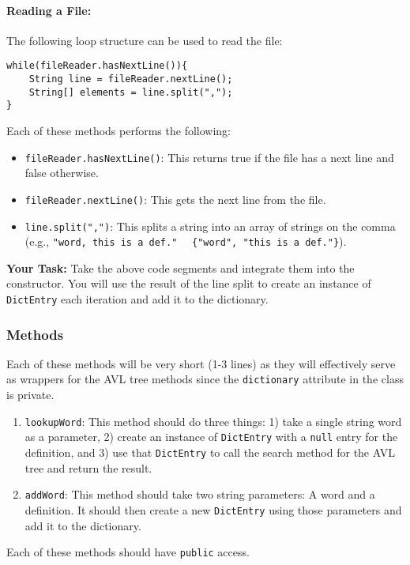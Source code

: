 \documentclass[a4paper]{article}
\begin{document}
\paragraph{Reading a File: } 

The following loop structure can be used to read the file:
\begin{lstlisting}[frame=trBL]
while(fileReader.hasNextLine()){
    String line = fileReader.nextLine();
    String[] elements = line.split(",");
}
\end{lstlisting}

Each of these methods performs the following:
\begin{itemize}
    \item \lstinline|fileReader.hasNextLine()|: This returns true if the file has a next line and false otherwise.
    \item \lstinline|fileReader.nextLine()|: This gets the next line from the file.
    \item \lstinline|line.split(",")|: This splits a string into an array of strings on the comma (e.g., \lstinline|"word, this is a def."| \ \textrightarrow \ \lstinline|{"word", "this is a def."}|).
\end{itemize}

\textbf{Your Task:} Take the above code segments and integrate them into the
constructor. You will use the result of the line split to create an instance of
\lstinline|DictEntry| each iteration and add it to the dictionary.

\subsubsection*{Methods}

Each of these methods will be very short (1-3 lines) as they will effectively serve as 
wrappers for the AVL tree methods since the \lstinline|dictionary| attribute in the 
class is private.
\begin{enumerate}
    \item \lstinline|lookupWord|: This method should do three things: 1) take a single string word as a parameter, 2) create an instance of \lstinline|DictEntry| with a \lstinline|null| entry for the definition, and 3) use that \lstinline|DictEntry| to call the search method for the AVL tree and return the result. 
    \item \lstinline|addWord|: This method should take two string parameters: A word and a definition. It should then create a new \lstinline|DictEntry| using those parameters and add it to the dictionary.
\end{enumerate}
Each of these methods should have \lstinline|public| access.
\end{document}
